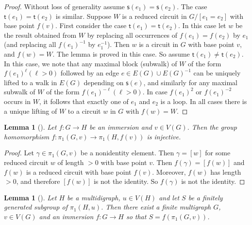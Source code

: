\documentclass[11pt]{amsart}
\newtheorem{lemma}[theorem]{Lemma}
\theoremstyle{definition}
\theoremstyle{definition}
\numberwithin{equation}{section}
\begin{document}
\begin{proof} Without loss of generality assume $\mathsf{s}(e_1)=\mathsf{s}(e_2)$. The case $\mathsf{t}(e_1)=\mathsf{t}(e_2)$ is similar. Suppose $W$ is a reduced circuit in $G/[e_1=e_2]$ with base point $f(v)$. First consider the case $\mathsf{t}(e_1)=\mathsf{t}(e_2)$. In this case let $w$ be the result obtained from $W$ by replacing all occurrences of $f(e_1)=f(e_2)$ by $e_1$ (and replacing all $f(e_1)^{-1}$ by $e_1^{-1}$). Then $w$ is a circuit in $G$ with base point $v$, and $f(w)=W$. The lemma is proved in this case. So assume $\mathsf{t}(e_1)\neq \mathsf{t}(e_2)$. In this case, we note that any maximal block (subwalk) of $W$ of the form $f(e_1)^\ell (\ell>0)$ followed by an edge $e\in E(G)\cup E(G)^{-1}$ can be uniquely lifted to a walk in $E(G)$ depending on $\mathsf{s}(e)$, and similarly for any maximal subwalk of $W$ of the form $f(e_1)^{-\ell} (\ell>0)$. In case $f(e_1)^2$ or $f(e_1)^{-2}$ occurs in $W$, it follows that exactly one of $e_1$ and $e_2$ is a loop. In all cases there is a unique lifting of $W$ to a circuit $w$ in $G$ with $f(w)=W$.
\end{proof}


\begin{lemma}[{\cite[Proposition 5.3]{St83}}] \label{lem:im2inj} Let $f\colon G\to H$ be an immersion and $v\in V(G)$. Then the group homomorphism $f\colon \pi_1(G, v)\to \pi_1(H, f(v))$ is injective.
\end{lemma}

\begin{proof} Let $\gamma\in \pi_1(G, v)$ be a nonidentity element. Then $\gamma=[w]$ for some reduced circuit $w$ of length $>0$ with base point $v$. Then $f(\gamma)=[f(w)]$ and $f(w)$ is a reduced circuit with base point $f(v)$. Moreover, $f(w)$ has length $>0$, and therefore $[f(w)]$ is not the identity. So $f(\gamma)$ is not the identity.
\end{proof}



\begin{lemma}[{\cite[5.4]{St83}}] \label{lem:rep} Let $H$ be a multidigraph, $u\in V(H)$ and let $S$ be a finitely generated subgroup of $\pi_1(H, u)$. Then there exist a finite multigraph $G$, $v\in V(G)$ and an immersion $f\colon G\to H$ so that $S=f(\pi_1(G, v))$.
\end{lemma}
\end{document}
